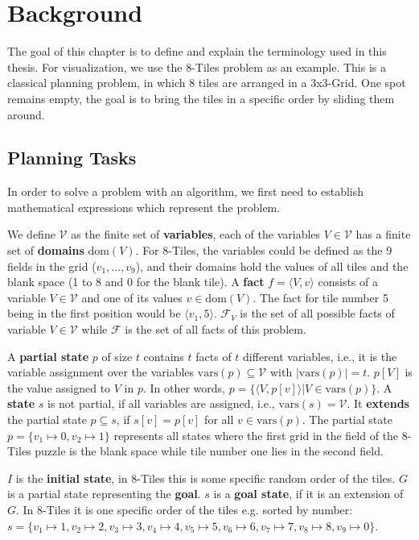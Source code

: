 
\chapter{Background}\label{ch:background}

The goal of this chapter is to define and explain the terminology used in this thesis.
For visualization, we use the 8-Tiles problem as an example.
This is a classical planning problem, in which 8 tiles are arranged in a 3x3-Grid.
One spot remains empty, the goal is to bring the tiles in a specific order by sliding them around.

\section {Planning Tasks}\label{sec:planning-tasks}
In order to solve a problem with an algorithm, we first need to establish mathematical expressions which represent the problem.

We define $\mathcal{V}$ as the finite set of \textbf{variables}, each of the variables $V\in\mathcal{V}$ has a finite set of \textbf{domains} $\text{dom}(V)$.
For 8-Tiles, the variables could be defined as the 9 fields in the grid ($v_1,\dots,v_9$), and their domains hold the values of all tiles and the blank space (1 to 8 and 0 for the blank tile).
A \textbf{fact} $f=\langle V, v\rangle$ consists of a variable $V\in\mathcal{V}$ and one of its values $v\in\text{dom}(V)$.
The fact for tile number 5 being in the first position would be $\langle v_1,5\rangle$.
$\mathcal{F}_V$ is the set of all possible facts of variable $V\in\mathcal{V}$ while $\mathcal{F}$ is the set of all facts of this problem.

A \textbf{partial state} $p$ of size $t$ contains $t$ facts of $t$ different variables, i.e., it is the variable assignment over the variables $\text{vars}(p)\subseteq\mathcal{V}$ with $|\text{vars}(p)|=t$.
$p[V]$ is the value assigned to $V$ in $p$.
In other words, $p=\{\langle V, p[v] \rangle | V\in\text{vars}(p)\}$.
A \textbf{state} $s$ is not partial, if all variables are assigned, i.e., $\text{vars}(s)=\mathcal{V}$.
It \textbf{extends} the partial state $p\subseteq s$, if $s[v] = p[v]$ for all $v \in\text{vars}(p)$.
The partial state $p = \{v_1\mapsto0, v_2\mapsto1\}$ represents all states where the first grid in the field of the 8-Tiles puzzle is the blank space while tile number one lies in the second field.

$I$ is the \textbf{initial state}, in 8-Tiles this is some specific random order of the tiles.
$G$ is a partial state representing the \textbf{goal}. $s$ is a \textbf{goal state}, if it is an extension of $G$.
In 8-Tiles it is one specific order of the tiles e.g. sorted by number:
$s = \{v_1\mapsto1, v_2\mapsto2, v_3\mapsto3, v_4\mapsto4, v_5\mapsto5, v_6\mapsto6, v_7\mapsto7, v_8\mapsto8, v_9\mapsto0\}$.

